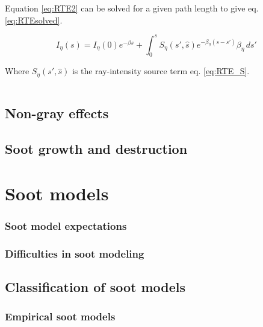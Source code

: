 Equation \ref{eq:RTE2} can be solved for a given path length to give eq. \ref{eq:RTEsolved}.

\begin{equation}
    I_\eta{}(s) = I_\eta{}(0)e^{-\beta{}s}+\int^s_0{S_\eta{}(s',\hat{s})e^{-\beta{}_\eta(s-s')}\beta_\eta{}\,ds'}
    \label{eq:RTEsolved}
\end{equation}

Where $S_\eta{}(s',\hat{s})$ is the ray-intensity source term eq. \ref{eq:RTE_S}.

\begin{equation}

    \label{eq:RTE_S}
\end{equation}

\subsection{Non-gray effects}\label{Ch:Nongray}


\subsection{Soot growth and destruction}


\section{Soot models}

\subsubsection{Soot model expectations}

\subsubsection{Difficulties in soot modeling}





\subsection{Classification of soot models}

\subsubsection{Empirical soot models}


